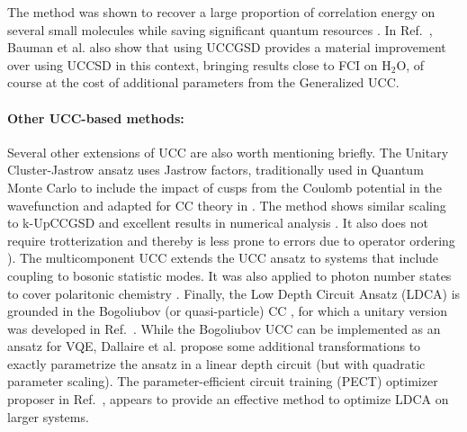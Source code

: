 The method was shown to recover a large proportion of correlation energy on several small molecules while saving significant quantum resources \cite{Metcalf2020}. In Ref.~\cite{Bauman2021}, Bauman et al. also show that using UCCGSD provides a material improvement over using UCCSD in this context, bringing results close to FCI on $\mathrm{H_2O}$, of course at the cost of additional parameters from the Generalized UCC.  

\paragraph{Other UCC-based methods:} Several other extensions of UCC are also worth mentioning briefly. The Unitary Cluster-Jastrow \cite{Matsuzawa2020} ansatz uses Jastrow factors, traditionally used in Quantum Monte Carlo \cite{Foulkes2001} to include the impact of cusps from the Coulomb potential in the wavefunction and adapted for CC theory in \cite{Neuscamman2013}. The method shows similar scaling to k-UpCCGSD and excellent results in numerical analysis \cite{Matsuzawa2020}. It also does not require trotterization and thereby is less prone to errors due to operator ordering \cite{Grimsley2019_UCC_Review}). The multicomponent UCC \cite{Pavosevic2018}  extends the UCC ansatz to systems that include coupling to bosonic statistic modes. It was also applied to photon number states to cover polaritonic chemistry \cite{Pavosevic2021}. Finally, the Low Depth Circuit Ansatz (LDCA) \cite{Dallaire2019} is grounded in the Bogoliubov (or quasi-particle) CC \cite{Stolarczyk2010, Rolik2014, Signoracci2015}, for which a unitary version was developed in Ref.~\cite{Dallaire2019}. While the Bogoliubov UCC can be implemented as an ansatz for VQE, Dallaire et al. \cite{Dallaire2019} propose some additional transformations to exactly parametrize the ansatz in a linear depth circuit (but with quadratic parameter scaling). The parameter-efficient circuit training (PECT) optimizer proposer in Ref.~\cite{Sim2021}, appears to provide an effective method to optimize LDCA on larger systems. \\
\\

